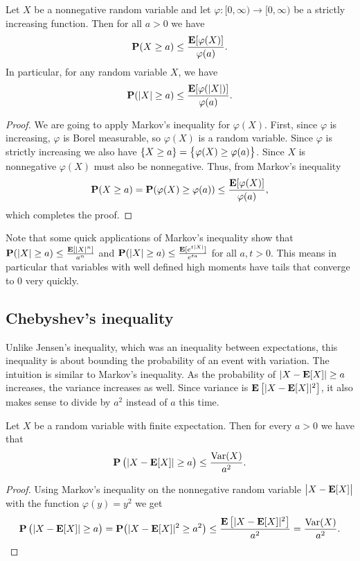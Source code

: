 \documentclass[11pt,a4paper]{article}
\begin{document}
\begin{proposition}
  Let $X$ be a nonnegative random variable and let
  $\varphi \colon [0,\infty) \to [0,\infty)$ be a strictly increasing function.
  Then for all $a > 0$ we have
  \[
    \mathbf{P}(X \geq a) \le \frac{\mathbf{E}[\varphi(X)]}{\varphi(a)}.
  \]
  In particular, for any random variable $X$, we have
  \[
    \mathbf{P}(|X| \geq a) \le \frac{\mathbf{E}[\varphi(|X|)]}{\varphi(a)}.
  \]
\end{proposition}
\begin{proof}
  We are going to apply Markov's inequality for
  $\varphi(X)$.
  First, since $\varphi$ is increasing,
  $\varphi$ is Borel measurable, so $\varphi(X)$ is a random variable.
  Since $\varphi$ is strictly increasing we also have $\left\{X \geq a\right\} =
  \left\{\varphi(X) \geq \varphi(a)\right\}$.
  Since $X$ is nonnegative $\varphi(X)$ must also be nonnegative.
  Thus, from Markov's inequality
  \[
    \mathbf{P}(X \geq a) =
    \mathbf{P}(\varphi(X) \geq \varphi(a)) \le
    \frac{\mathbf{E}[\varphi(X)]}{\varphi(a)},
  \]
  which completes the proof.
\end{proof}

\begin{remark}
  Note that some quick applications of Markov's inequality
  show that $\mathbf{P}(|X| \geq a) \le \frac{\mathbf{E}[|X|^n]}{a^n}$
  and $\mathbf{P}(|X| \geq a) \le \frac{\mathbf{E}[e^{t|X|}]}{e^{ta}}$ for
  all $a,t > 0$.
  This means in particular that variables with well defined high
  moments have tails that converge to $0$ very quickly.
\end{remark}

\subsection{Chebyshev's inequality}
Unlike Jensen's inequality, which was an inequality between expectations,
this inequality is about bounding the probability of an event
with variation.
The intuition is similar to Markov's inequality.
As the probability of $|X - \mathbf{E}[X]| \geq a$ increases,
the variance increases as well.
Since variance is $\mathbf{E}\left[|X-\mathbf{E}[X]|^{2}\right]$,
it also makes sense to divide by $a^2$ instead of $a$ this time.

\begin{theorem}
  Let $X$ be a random variable with finite expectation. Then for every
  $a > 0$ we have that
  \[
    \Prob\del{|X - \E[X]| \geq a} \le
    \frac{\Var(X)}{a^2}.
  \]
\end{theorem}
\begin{proof}
  Using Markov's inequality on 
  the nonnegative random variable $\left\lvert X - \mathbf{E}[X]\right\rvert$ with the function
  $\varphi(y) = y^2$ we get
  \[
    \Prob\del{|X-\E[X]| \geq a} =
    \Prob\del[1]{|X-\E[X]|^{2} \geq a^{2}} \leq
    \frac{\E\left[|X-\E[X]|^{2}\right]}{a^{2}} =
    \frac{\Var(X)}{a^2}.
  \]
\end{proof}
\end{document}
